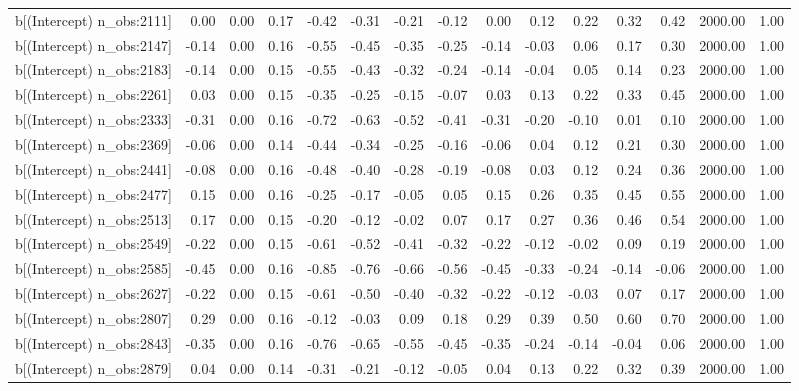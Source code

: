 \begin{table}[ht]
\begin{tabular}{rrrrrrrrrrrrrrr}
  b[(Intercept) n\_obs:2111] & 0.00 & 0.00 & 0.17 & -0.42 & -0.31 & -0.21 & -0.12 & 0.00 & 0.12 & 0.22 & 0.32 & 0.42 & 2000.00 & 1.00 \\ 
  b[(Intercept) n\_obs:2147] & -0.14 & 0.00 & 0.16 & -0.55 & -0.45 & -0.35 & -0.25 & -0.14 & -0.03 & 0.06 & 0.17 & 0.30 & 2000.00 & 1.00 \\ 
  b[(Intercept) n\_obs:2183] & -0.14 & 0.00 & 0.15 & -0.55 & -0.43 & -0.32 & -0.24 & -0.14 & -0.04 & 0.05 & 0.14 & 0.23 & 2000.00 & 1.00 \\ 
  b[(Intercept) n\_obs:2261] & 0.03 & 0.00 & 0.15 & -0.35 & -0.25 & -0.15 & -0.07 & 0.03 & 0.13 & 0.22 & 0.33 & 0.45 & 2000.00 & 1.00 \\ 
  b[(Intercept) n\_obs:2333] & -0.31 & 0.00 & 0.16 & -0.72 & -0.63 & -0.52 & -0.41 & -0.31 & -0.20 & -0.10 & 0.01 & 0.10 & 2000.00 & 1.00 \\ 
  b[(Intercept) n\_obs:2369] & -0.06 & 0.00 & 0.14 & -0.44 & -0.34 & -0.25 & -0.16 & -0.06 & 0.04 & 0.12 & 0.21 & 0.30 & 2000.00 & 1.00 \\ 
  b[(Intercept) n\_obs:2441] & -0.08 & 0.00 & 0.16 & -0.48 & -0.40 & -0.28 & -0.19 & -0.08 & 0.03 & 0.12 & 0.24 & 0.36 & 2000.00 & 1.00 \\ 
  b[(Intercept) n\_obs:2477] & 0.15 & 0.00 & 0.16 & -0.25 & -0.17 & -0.05 & 0.05 & 0.15 & 0.26 & 0.35 & 0.45 & 0.55 & 2000.00 & 1.00 \\ 
  b[(Intercept) n\_obs:2513] & 0.17 & 0.00 & 0.15 & -0.20 & -0.12 & -0.02 & 0.07 & 0.17 & 0.27 & 0.36 & 0.46 & 0.54 & 2000.00 & 1.00 \\ 
  b[(Intercept) n\_obs:2549] & -0.22 & 0.00 & 0.15 & -0.61 & -0.52 & -0.41 & -0.32 & -0.22 & -0.12 & -0.02 & 0.09 & 0.19 & 2000.00 & 1.00 \\ 
  b[(Intercept) n\_obs:2585] & -0.45 & 0.00 & 0.16 & -0.85 & -0.76 & -0.66 & -0.56 & -0.45 & -0.33 & -0.24 & -0.14 & -0.06 & 2000.00 & 1.00 \\ 
  b[(Intercept) n\_obs:2627] & -0.22 & 0.00 & 0.15 & -0.61 & -0.50 & -0.40 & -0.32 & -0.22 & -0.12 & -0.03 & 0.07 & 0.17 & 2000.00 & 1.00 \\ 
  b[(Intercept) n\_obs:2807] & 0.29 & 0.00 & 0.16 & -0.12 & -0.03 & 0.09 & 0.18 & 0.29 & 0.39 & 0.50 & 0.60 & 0.70 & 2000.00 & 1.00 \\ 
  b[(Intercept) n\_obs:2843] & -0.35 & 0.00 & 0.16 & -0.76 & -0.65 & -0.55 & -0.45 & -0.35 & -0.24 & -0.14 & -0.04 & 0.06 & 2000.00 & 1.00 \\ 
  b[(Intercept) n\_obs:2879] & 0.04 & 0.00 & 0.14 & -0.31 & -0.21 & -0.12 & -0.05 & 0.04 & 0.13 & 0.22 & 0.32 & 0.39 & 2000.00 & 1.00 \\ 

\end{tabular}
\end{table}

